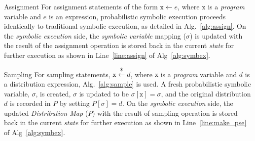 \begin{paragraph}{Assignment}
	For assignment statements of the form $\mathtt{x} \leftarrow e$, where $\mathtt{x}$ is a \textit{program} variable and $e$ is an expression, probabilistic symbolic execution proceeds identically to traditional symbolic execution, as detailed in Alg.~\ref{alg:assign}.
	On the \textit{symbolic execution} side, the \textit{symbolic variable} mapping ($\sigma$) is updated with the result of the assignment operation is stored back in the current \textit{state} for further execution as shown in Line~\ref{line:assign} of Alg~\ref{alg:symbex}.
\end{paragraph}

\begin{algorithm}
	\caption{PSE Sampling Algorithm}
	\label{alg:sample}
	\begin{algorithmic}[1]
		\State{$\sigma[\mathtt{x}] = \sigma$}
		\State{}
		\EndFunction
	\end{algorithmic}
\end{algorithm}

\begin{paragraph}{Sampling}
	For sampling statements, $\mathtt{x} \xleftarrow{\$} d$, where $\mathtt{x}$ is a \textit{program} variable and $d$ is a distribution expression, Alg.~\ref{alg:sample} is used.
	A fresh probabilistic symbolic variable, $\sigma$, is created, $\sigma$ is updated to be $\sigma[\mathtt{x}] = \sigma$, and the original distribution $d$ is recorded in $P$ by setting $P[\sigma] = d$.
	On the \textit{symbolic execution} side, the updated \textit{Distribution Map} ($P$) with the result of sampling operation is stored back in the current \textit{state} for further execution as shown in Line~\ref{line:make_pse} of Alg~\ref{alg:symbex}.  
\end{paragraph}

\begin{algorithm}
	\caption{PSE Branch Algorithm}
	\label{alg:branch}
	\begin{algorithmic}[1]
		\State{}
		\EndFunction
	\end{algorithmic}
\end{algorithm}

